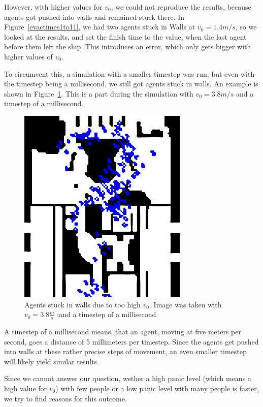 \documentclass[11pt]{article}
\begin{document}
However, with higher values for \(v_0\), we could not reproduce the results, because
agents got pushed into walls and remained stuck there. In Figure~\ref{evactimes1to11},
we had two agents stuck in Walls at \(v_0 = 1.4m/s\), so we looked at the results,
and set the finish time to the value, when the last agent before them left
the ship. This introduces an error, which only gets bigger with higher values of \(v_0\).

To circumvent this, a simulation with a smaller timestep was run, but even with the timestep 
being a millisecond, we still got agents stuck in walls. An example is shown in Figure~\ref{stuckinwall}. This is a part during the simulation with \(v_0 = 3.8m/s\) and a timestep of a millisecond.

\begin{figure}[h]
	\centering
	\includegraphics[scale=1]{images/StuckInWall.png}
	\caption{Agents stuck in walls due to too high \(v_0\). Image was taken with \(v_0=3.8\frac{m}{s}\) :and a timestep of a millisecond.}
	\label{stuckinwall}
	
\end{figure}

A timestep of a millisecond means, that an agent, moving at five meters per second,
goes a distance of 5 millimeters per timestep. Since the agents get pushed into walls
at these rather precise steps of movement, an even smaller timestep will likely yield similar results. 


Since we cannot answer our question, wether a high panic level (which means a high value for \(v_0\))
with few people
or a low panic level with many people is faster, we try to find reasons for this outcome.
\end{document}
